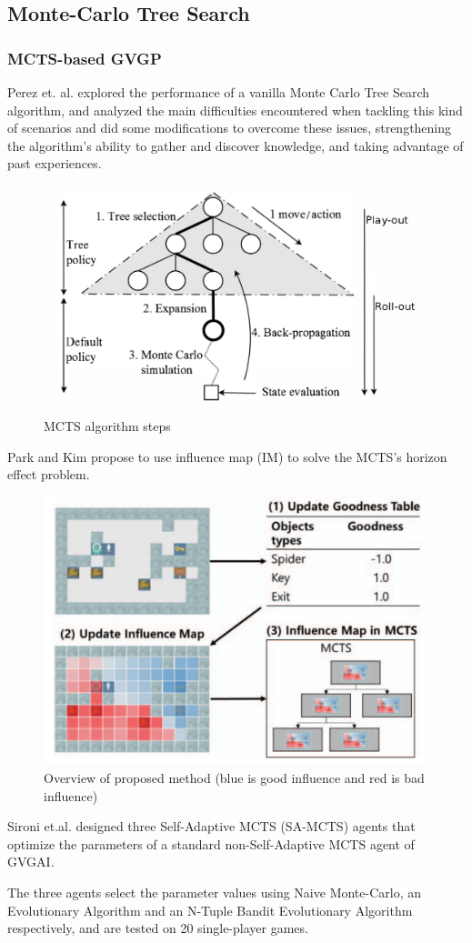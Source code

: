 \documentclass{beamer}
\begin{document}
\subsection{Monte-Carlo Tree Search}
\begin{frame}[allowframebreaks]
\frametitle{MCTS-based GVGP}
Perez et. al. \cite{8} explored the performance of a vanilla Monte Carlo Tree Search algorithm, and analyzed the main difficulties encountered when tackling this kind of scenarios and did some modifications to overcome these issues, strengthening the algorithm's ability to gather and discover knowledge, and taking advantage of past experiences.

\begin{figure}[c]
  \includegraphics[width=0.6\linewidth]{figures/mctskb}
  \caption{ MCTS algorithm steps }
\end{figure}

Park and Kim propose to use influence map (IM) to solve
the MCTS’s horizon effect problem.

\begin{figure}[c]
  \includegraphics[width=0.6\linewidth]{figures/kim}
  \caption{ Overview of proposed method (blue is good influence and red is bad influence) }
\end{figure}

Sironi et.al. designed three Self-Adaptive MCTS (SA-MCTS) agents that optimize the parameters of a standard non-Self-Adaptive MCTS agent of GVGAI. 

The three agents select the parameter values using Naive Monte-Carlo, an Evolutionary Algorithm and an N-Tuple Bandit Evolutionary Algorithm respectively, and are tested on 20 single-player games.


\end{frame}
\end{document}
